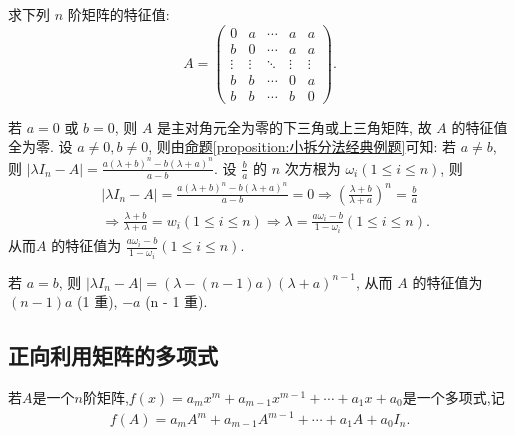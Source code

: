 \documentclass[lang=cn,newtx,10pt,scheme=chinese]{elegantbook}
\begin{document}
\begin{example}
求下列 $n$ 阶矩阵的特征值:
\[
A = \begin{pmatrix}
0 & a & \cdots & a & a \\
b & 0 & \cdots & a & a \\
\vdots & \vdots & \ddots & \vdots & \vdots \\
b & b & \cdots & 0 & a \\
b & b & \cdots & b & 0
\end{pmatrix}.
\]
\end{example}
\begin{solution}
若 $a = 0$ 或 $b = 0$, 则 $A$ 是主对角元全为零的下三角或上三角矩阵, 故 $A$ 的特征值全为零. 设 $a \neq 0, b \neq 0$, 则由\hyperref[proposition:小拆分法经典例题]{命题\ref{proposition:小拆分法经典例题}}可知:
若 $a \neq b$, 则 $|\lambda I_n-A|=\frac{a(\lambda +b)^n-b(\lambda +a)^n}{a-b}$. 设 $\frac{b}{a}$ 的 $n$ 次方根为 $\omega_i (1 \leq i \leq n)$, 则
\begin{align*}
&|\lambda I_n-A|=\frac{a(\lambda +b)^n-b(\lambda +a)^n}{a-b}=0\Rightarrow \left( \frac{\lambda +b}{\lambda +a} \right) ^n=\frac{b}{a}
\\
&\Rightarrow \frac{\lambda +b}{\lambda +a}=w_i\left( 1\le i\le n \right) \Rightarrow \lambda =\frac{a\omega _i-b}{1-\omega _i}(1\le i\le n).
\end{align*}
从而$A$ 的特征值为 $\frac{a \omega_i - b}{1 - \omega_i} (1 \leq i \leq n)$.

若 $a = b$, 则 $|\lambda I_n - A| = (\lambda - (n - 1)a)(\lambda + a)^{n-1}$, 从而 $A$ 的特征值为 $(n - 1)a$ (1 重), $-a$ (n - 1 重). 
\end{solution}

\subsection{正向利用矩阵的多项式}

\begin{definition}[矩阵多项式]
若$A$是一个$n$阶矩阵,$f(x) = a_m x^m + a_{m-1} x^{m-1} + \cdots + a_1 x + a_0$是一个多项式,记
\begin{align*}
f(A) = a_m A^m + a_{m-1} A^{m-1} + \cdots + a_1 A + a_0 I_n.
\end{align*}
\end{definition}
\end{document}
